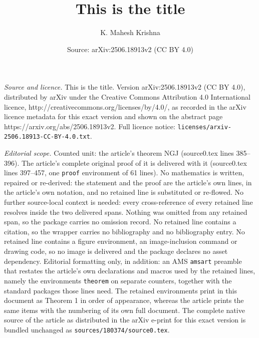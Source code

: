 \documentclass[10pt,a4paper]{amsart}
\title{This is the title}
\author{K. Mahesh Krishna}
\date{Source: arXiv:2506.18913v2 (CC BY 4.0)}
\begin{document}
\maketitle

\noindent\emph{Source and licence.} This is the title. Version arXiv:2506.18913v2 (CC BY 4.0), distributed by arXiv under the Creative Commons Attribution 4.0 International licence, http://creativecommons.org/licenses/by/4.0/, as recorded in the arXiv licence metadata for this exact version and shown on the abstract page https://arxiv.org/abs/2506.18913v2. Full licence notice: \texttt{licenses/arxiv-2506.18913-CC-BY-4.0.txt}.\par\smallskip

\noindent\textit{Editorial scope.} Counted unit: the article's theorem NGJ (source0.tex lines 385--396). The article's complete original proof of it is delivered with it (source0.tex lines 397--457, one \texttt{proof} environment of 61 lines). No mathematics is written, repaired or re-derived: the statement and the proof are the article's own lines, in the article's own notation, and no retained line is substituted or re-flowed.  No further source-local context is needed: every cross-reference of every retained line resolves inside the two delivered spans.  Nothing was omitted from any retained span, so the package carries no omission record.  No retained line contains a citation, so the wrapper carries no bibliography and no bibliography entry.  No retained line contains a figure environment, an image-inclusion command or drawing code, so no image is delivered and the package declares no asset dependency.  Editorial formatting only, in addition: an AMS \texttt{amsart} preamble that restates the article's own declarations and macros used by the retained lines, namely the environments \texttt{theorem} on separate counters, together with the standard packages those lines need.  The retained environments print in this document as Theorem 1 in order of appearance, whereas the article prints the same items with the numbering of its own full document.  The complete native source of the article as distributed in the arXiv e-print for this exact version is bundled unchanged as \texttt{sources/180374/source0.tex}.
\end{document}
